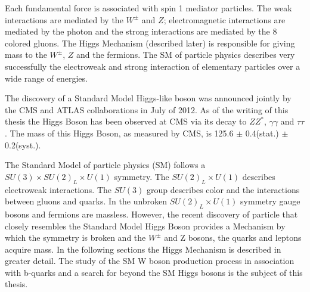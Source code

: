 Each fundamental force is associated with spin 1 mediator particles.
The weak interactions are mediated by the $W^{\pm}$ and $Z$;
electromagnetic interactions are mediated by the photon and the strong interactions
are mediated by the 8 colored gluons. The Higgs Mechanism (described later) 
is responsible for giving mass to the $W^{\pm}$, $Z$ and the fermions. 
The SM of particle physics describes very successfully the electroweak and strong
interaction of elementary particles over a wide range of energies.

The discovery of a Standard Model Higgs-like boson was announced jointly 
by the CMS and ATLAS collaborations in July of 2012. %
As of the writing of this thesis the Higgs Boson has been observed at CMS via
its decay to $ZZ^{*}$, $\gamma\gamma$ and $\tau\tau$. The mass of this
Higgs Boson, as measured by CMS, is 125.6 $\pm$ 0.4(stat.) $\pm$ 0.2(syst.).

The Standard Model of particle physics (SM) follows a $SU(3)\times SU(2)_{L}\times U(1)$ %
symmetry. The $SU(2)_{L}\times U(1)$ describes electroweak interactions.
The $SU(3)$ group describes color and the interactions
between gluons and quarks. In the unbroken $SU(2)_{L}\times U(1)$ symmetry
gauge bosons and fermions are massless. However, the recent
discovery of particle that closely resembles the Standard Model Higgs
Boson provides a Mechanism by which the symmetry is broken
and the $W^{\pm}$ and Z bosons, the quarks and leptons acquire mass. 
In the following sections the Higgs Mechanism is described in greater detail.
The study of the SM W boson production process in association with b-quarks and a search for beyond the SM Higgs bosons is the subject of this thesis.

